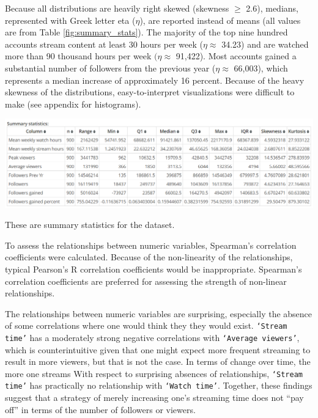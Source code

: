 \documentclass[12pt]{article}
\begin{document}
Because all distributions are heavily right skewed (skewness $\geq$ 2.6), medians, represented with Greek letter eta ($\eta$), are reported instead of means (all values are from Table \ref{fig:summary_stats}). The majority of the top nine hundred accounts stream content at least 30 hours per week ($\eta \approx$ 34.23) and are watched more than 90 thousand hours per week $(\eta \approx$ 91,422). Most accounts gained a substantial number of followers from the previous year ($\eta \approx$ 66,003), which represents a median increase of approximately 16 percent. Because of the heavy skewness of the distributions, easy-to-interpret visualizations were difficult to make (see appendix for histograms).

\begin{table}[t]
  \centering
  \includegraphics[width=\linewidth]{../StatCrunch_Results/reciprocal/table}
  \caption[Summary Statistics]{These are summary statistics for the dataset.}
  \label{fig:summary_stats}
\end{table}

To assess the relationships between numeric variables, Spearman’s correlation coefficients were calculated. Because of the non-linearity of the relationships, typical Pearson’s R correlation coefficients would be inappropriate. Spearman’s correlation coefficients are preferred for assessing the strength of non-linear relationships.

The relationships between numeric variables are surprising, especially the absence of some correlations where one would think they they would exist. \texttt{`Stream time’} has a moderately strong negative correlations with \texttt{`Average viewers’}, which is counterintuitive given that one might expect more frequent streaming to result in more viewers, but that is not the case. In terms of change over time, the more one streams With respect to surprising absences of relationships, \texttt{`Stream time’} has practically no relationship with \texttt{`Watch time’}. Together, these findings suggest that a strategy of merely increasing one’s streaming time does not “pay off” in terms of the number of followers or viewers.

\end{document}
